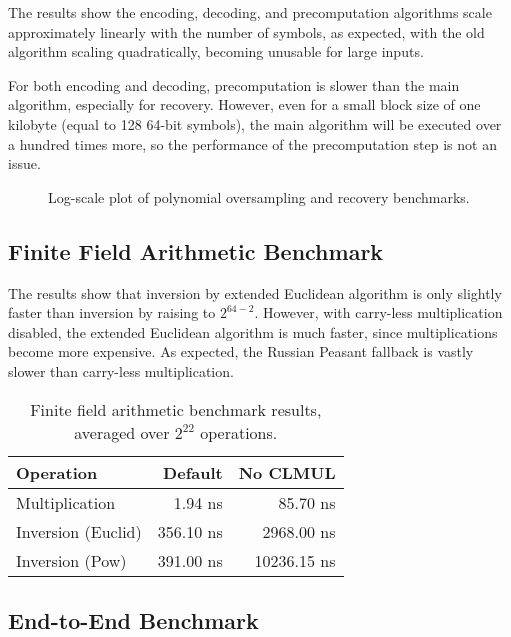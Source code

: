 The results show the encoding, decoding, and precomputation algorithms scale approximately linearly with the number of symbols, as expected, with the old algorithm scaling quadratically, becoming unusable for large inputs.

For both encoding and decoding, precomputation is slower than the main algorithm, especially for recovery.
However, even for a small block size of one kilobyte (equal to 128 64-bit symbols), the main algorithm will be executed over a hundred times more, so the performance of the precomputation step is not an issue.

\begin{figure}[!hbt]
\begin{center}

\end{center}
\caption{Log-scale plot of polynomial oversampling and recovery benchmarks.}
\end{figure}

\subsection{Finite Field Arithmetic Benchmark}

The results show that inversion by extended Euclidean algorithm is only slightly faster than inversion by raising to $2^{64 - 2}$.
However, with carry-less multiplication disabled, the extended Euclidean algorithm is much faster, since multiplications become more expensive.
As expected, the Russian Peasant fallback is vastly slower than carry-less multiplication.

\begin{table}[hbt]
\centering
\caption{Finite field arithmetic benchmark results, averaged over $2^{22}$ operations.}
\begin{tabular}{lrr}
\toprule
\textbf{Operation} & \textbf{Default} & \textbf{No CLMUL} \\
\midrule
Multiplication     & 1.94 ns   & 85.70 ns   \\
Inversion (Euclid) & 356.10 ns & 2968.00 ns \\
Inversion (Pow)    & 391.00 ns & 10236.15 ns \\
\bottomrule
\end{tabular}
\end{table}
\vspace{-1em}

\subsection{End-to-End Benchmark}

